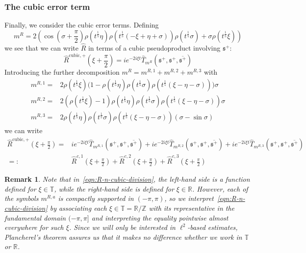 \documentclass[letterpaper, reqno,final]{amsart}
\newcommand{\bbZ}{\mathbb{Z}}
\newcommand{\bbR}{\mathbb{R}}
\newcommand{\bbT}{\mathbb{T}}
\newcommand{\fs}{\mathfrak{s}}
\newcommand{\fhPi}{\frac{\pi}{2}}
\newcommand{\SSCutoff}[1][\xi]{\rho(t^\frac{1}{5} #1)}
\newtheorem{rmk}{Remark}
\begin{document}
\subsubsection{The cubic error term}
Finally, we consider the cubic error terms.  Defining 
\begin{equation*}
    m^R = 2\left(\cos (\sigma + \fhPi) \rho(t^{\frac{1}{5}}\eta) \rho(t^{\frac{1}{5}}(-\xi + \eta +\sigma)) \rho(t^{\frac{1}{5}}\sigma) + \sigma\rho(t^{\frac{1}{5}}\xi)\right)
\end{equation*}
we see that we can write $\hat{R}$ in terms of a cubic pseudoproduct involving $\fs^+$:
\begin{equation*}
    \hat{R}^{\text{cubic},+}(\xi + \fhPi) = ie^{-2i\xi t} \hat{T}_{m^R}(\fs^+, \fs^+, \overline{\fs^+})
\end{equation*}
Introducing the further decomposition $m^R = m^{R,1} + m^{R,2} + m^{R,3}$ with
\begin{equation*}\begin{split}
    m^{R,1} =& 2\SSCutoff\bigl(1-\SSCutoff[\eta]\SSCutoff[\sigma]\SSCutoff[(\xi - \eta - \sigma)] \bigr) \sigma\\
    m^{R,2} =& 2(\SSCutoff- 1) \SSCutoff[\eta]\SSCutoff[\sigma]\SSCutoff[(\xi - \eta - \sigma)] \sigma\\
    m^{R,3} =& 2\SSCutoff[\eta]\SSCutoff[\sigma]\SSCutoff[(\xi - \eta - \sigma)](\sigma - \sin \sigma)
\end{split}\end{equation*}
we can write
\begin{equation}\label{eqn:R-n-cubic-division}\begin{split}
    \hat{R}^{\text{cubic},+}(\xi + \fhPi)  =& ie^{-2i\xi t}\hat{T}_{m^{R, 1}}(\fs^+, \fs^+, \overline{\fs^+}) + ie^{-2i\xi t}\hat{T}_{m^{R,2}}(\fs^+, \fs^+, \overline{\fs^+}) +ie^{-2i\xi t}\hat{T}_{m^{R,3}}(\fs^+, \fs^+, \overline{\fs^+})\\
    =:& \hat{R}^{c, 1}(\xi + \fhPi) + \hat{R}^{c, 2}(\xi + \fhPi) + \hat{R}^{c, 3}(\xi + \fhPi)
\end{split}\end{equation}
\begin{rmk}
    Note that in~\eqref{eqn:R-n-cubic-division}, the left-hand side is a function defined for $\xi \in \bbT$, while the right-hand side is defined for $\xi \in \bbR$.  However, each of the symbols $m^{R,a}$ is compactly supported in $(-\pi, \pi)$, so we interpret~\eqref{eqn:R-n-cubic-division} by associating each $\xi \in \bbT = \bbR / \bbZ$ with its representative in the fundamental domain $(-\pi,\pi]$ and interpreting the equality pointwise almost everywhere for such $\xi$.  Since we will only be interested in $\ell^2$-based estimates, Plancherel's theorem assures us that it makes no difference whether we work in $\bbT$ or $\bbR$.
\end{rmk}
\end{document}
